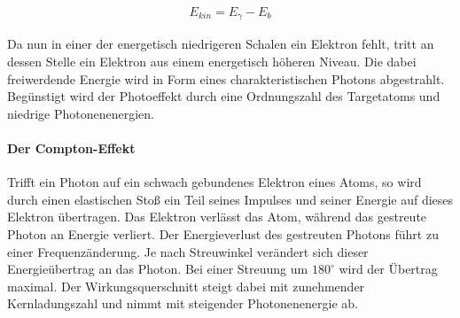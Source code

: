 \documentclass[11pt]{scrartcl}
\begin{document}
\begin{align}
E_{kin}=E_\gamma - E_b
\end{align}

Da nun in einer der energetisch niedrigeren Schalen ein Elektron fehlt, tritt an dessen Stelle ein Elektron aus einem energetisch höheren Niveau. Die dabei freiwerdende Energie wird in Form eines charakteristischen Photons abgestrahlt. Begünstigt wird der Photoeffekt durch eine Ordnungszahl des Targetatoms und niedrige Photonenenergien.

\paragraph{Der Compton-Effekt}

Trifft ein Photon auf ein schwach gebundenes Elektron eines Atoms, so wird durch einen elastischen Stoß ein Teil seines Impulses und seiner Energie auf dieses Elektron übertragen. Das Elektron verlässt das Atom, während das gestreute Photon an Energie verliert. Der Energieverlust des gestreuten Photons führt zu einer Frequenzänderung. Je nach Streuwinkel verändert sich dieser Energieübertrag an das Photon. Bei einer Streuung um $180^\circ$ wird der Übertrag maximal. Der Wirkungsquerschnitt steigt dabei mit zunehmender Kernladungszahl und nimmt mit steigender Photonenenergie ab. 
\end{document}
